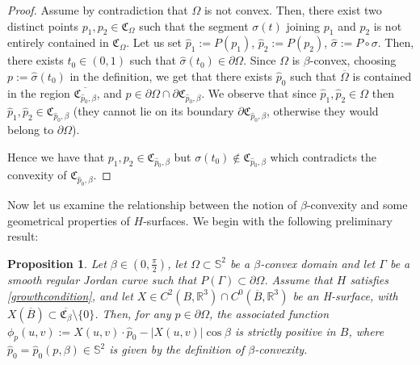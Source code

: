 \documentclass[a4paper,reqno,10pt,oneside]{amsart}
\numberwithin{equation}{section}
\newtheorem{proposition}[theorem]{Proposition}
\begin{document}
\begin{proof}
Assume by contradiction that $\Omega$ is not convex. Then, there exist two distinct points $p_1, p_2 \in \mathfrak{C}_\Omega$ such that the segment $\sigma(t)$ joining $p_1$ and $p_2$ is not entirely contained in $\mathfrak{C}_\Omega$. Let us set $\hat p_1:=P(p_1)$, $\hat p_2:=P(p_2)$, $\hat \sigma:=P\circ\sigma$. Then, there exists $t_0 \in (0,1)$ such that $\hat \sigma (t_0) \in \partial \Omega$. Since $\Omega$ is $\beta$-convex, choosing $p:=\hat \sigma (t_0)$ in the definition, we get that there exists $\hat p_0$ such that $\overline \Omega$ is contained in the region $\overline{\mathfrak{C}_{\hat p_0, \beta}}$, and $p \in \partial \Omega \cap \partial\mathfrak{C}_{\hat p_0, \beta}$. We observe that since $\hat p_1, \hat p_2 \in \Omega$ then $\hat p_1, \hat p_2 \in \mathfrak{C}_{\hat p_0, \beta}$ (they cannot lie on its boundary  $\partial\mathfrak{C}_{\hat p_0, \beta}$, otherwise they would belong to $\partial \Omega$).

Hence we have that $p_1, p_2 \in \mathfrak{C}_{\hat p_0, \beta}$ but $\sigma (t_0) \not \in \mathfrak{C}_{\hat p_0, \beta}$ which contradicts the convexity of $\mathfrak{C}_{\hat p_0, \beta}$.
\end{proof}

Now let us examine the relationship between the notion of $\beta$-convexity and some geometrical properties of $H$-surfaces. We begin with the following preliminary result:

 
 
 
 
 

\begin{proposition}\label{propphipos}
Let $\beta \in (0,\frac{\pi}{2})$, let $\Omega \subset \mathbb{S}^2$ be a $\beta$-convex domain and let $\Gamma$ be a  smooth regular Jordan curve such that $P(\Gamma)\subset \partial\Omega$. Assume that $H$ satisfies  \eqref{growthcondition}, and let $X \in C^2(B, {\mathbb R}^3) \cap C^0(\overline{B},{\mathbb R}^3)$ be an H-surface, with $X(\overline{B})\subset \overline{\mathfrak{C}_{\beta}} \setminus\{0\}$. Then, for any $p \in \partial \Omega$, the associated function $\phi_{p}(u,v):=X(u,v) \cdot \hat p_0 - |X(u,v)|\cos \beta$ is strictly positive in $B$, where $\hat p_0=\hat p_0(p,\beta) \in \mathbb{S}^2$  is given by the definition of $\beta$-convexity. 
\end{proposition}
\end{document}
